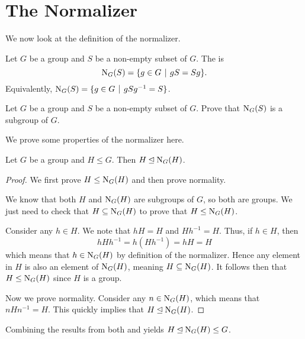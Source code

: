 \section{The Normalizer}
We now look at the definition of the normalizer.
\begin{definition}
    Let $G$ be a group and $S$ be a non-empty subset of $G$. The  is
    \[
        \N{G}{S} = \{g \in G \vert gS = Sg \}.
    \]
    Equivalently, $\N{G}{S} = \{g \in G \vert gSg^{-1} = S \}$.
\end{definition}
\begin{exercise}\label{exercise-normalizer-is-subgroup-of-main-group}
    Let $G$ be a group and $S$ be a non-empty subset of $G$. Prove that $\mathrm{N}_{G}(S)$ is a subgroup of $G$.
\end{exercise}

We prove some properties of the normalizer here.
\begin{proposition}\label{prop-subgroup-is-a-normal-subgroup-of-normalizer}
    Let $G$ be a group and $H \leq G$. Then $H \unlhd \mathrm{N}_{G}(H)$.
\end{proposition}
\begin{proof}
    We first prove $H \leq \mathrm{N}_{G}(H)$ and then prove normality.

    We know that both $H$ and $\mathrm{N}_{G}(H)$ are subgroups of $G$, so both are groups. We just need to check that $H \subseteq \mathrm{N}_{G}(H)$ to prove that $H \leq \mathrm{N}_{G}(H)$.

    Consider any $h \in H$. We note that $hH = H$ and $Hh^{-1} = H$. Thus, if $h \in H$, then
    \[
        hHh^{-1} = h(Hh^{-1}) = hH = H
    \]
    which means that $h \in \mathrm{N}_{G}(H)$ by definition of the normalizer. Hence any element in $H$ is also an element of $\mathrm{N}_{G}(H)$, meaning $H \subseteq \mathrm{N}_{G}(H)$. It follows then that $H \leq \mathrm{N}_{G}(H)$ since $H$ is a group.

    Now we prove normality. Consider any $n \in \mathrm{N}_{G}(H)$, which means that $nHn^{-1} = H$. This quickly implies that $H \unlhd \mathrm{N}_{G}(H)$.
\end{proof}
\begin{remark}
    Combining the results from both  and  yields $H \unlhd \mathrm{N}_{G}(H) \leq G$.
\end{remark}

